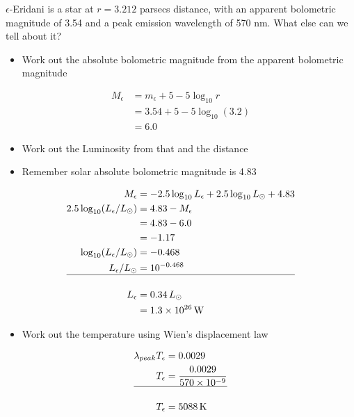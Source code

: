 \documentclass[
  letterpaper,
  DIV=11,
  numbers=noendperiod]{scrartcl}
\providecommand{\tightlist}{%
  \setlength{\itemsep}{0pt}\setlength{\parskip}{0pt}}\usepackage{longtable,booktabs,array}
\begin{document}
\(\epsilon\)-Eridani is a star at \(r=3.212\) parsecs distance, with an
apparent bolometric magnitude of 3.54 and a peak emission wavelength of
570 nm. What else can we tell about it?

\begin{itemize}
\tightlist
\item
  Work out the absolute bolometric magnitude from the apparent
  bolometric magnitude
\end{itemize}

\begin{align}
M_\epsilon &= m_\epsilon + 5 - 5\log_{10}r \\
  &= 3.54 + 5 - 5\log_{10}(3.2) \\
  &= 6.0
\end{align}

\begin{itemize}
\tightlist
\item
  Work out the Luminosity from that and the distance
\item
  Remember solar absolute bolometric magnitude is 4.83
\end{itemize}

\begin{align}
M_{\epsilon} &= -2.5\log_{10}L_\epsilon+2.5\log_{10}L_\odot + 4.83 \\
2.5\log_{10}(L_\epsilon / L_\odot) &= 4.83 - M_\epsilon \\
&= 4.83 - 6.0  \\
&= -1.17 \\
\log_{10}(L_\epsilon / L_\odot) & = -0.468 \\
L_\epsilon / L_\odot &= 10^{-0.468} \\
\hline \\
L_\epsilon &= 0.34\,L_\odot \\
&= 1.3\times 10^{26}\,\mathrm{W}
\end{align}

\begin{itemize}
\tightlist
\item
  Work out the temperature using Wien's displacement law
\end{itemize}

\begin{align}
\lambda_{peak} T_\epsilon &= 0.0029 \\
T_\epsilon &= \frac{0.0029}{ 570\times 10^{-9}} \\
\hline \\
T_\epsilon &= 5088\,\mathrm{K}
\end{align}
\end{document}
